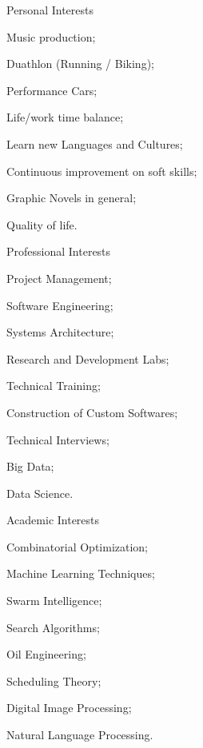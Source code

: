 \noindent
\vspace{-0.3cm}
\begin{multicols*}{3}
\begin{cventries}
\noindent
\cventry
   {Personal Interests}{}{}{}
   {
     \begin{cvitems}
       \item Music production;
       \item Duathlon (Running / Biking);
       \item Performance Cars;
       \item Life/work time balance;
       \item Learn new Languages and Cultures;
       \item Continuous improvement on soft skills;
       \item Graphic Novels in general;
       \item Quality of life.
       \end{cvitems}
   }
\end{cventries}
\columnbreak
\begin{cventries}
\noindent
\cventry
    {Professional Interests}{}{}{}
    {
      \begin{cvitems}
        \item Project Management;
        \item Software Engineering;
        \item Systems Architecture;
        \item Research and Development Labs;
        \item Technical Training;
        \item Construction of Custom Softwares;
        \item Technical Interviews;
        \item Big Data;
        \item Data Science.
      \end{cvitems}
    }
\end{cventries}
\columnbreak
\begin{cventries}
\noindent
\cventry
    {Academic Interests}{}{}{}
    {
      \begin{cvitems}
        \item Combinatorial Optimization;
        \item Machine Learning Techniques;
        \item Swarm Intelligence;
        \item Search Algorithms;
        \item Oil Engineering;
        \item Scheduling Theory;
        \item Digital Image Processing;
        \item Natural Language Processing.
      \end{cvitems}
    }
\end{cventries}
\end{multicols*}
